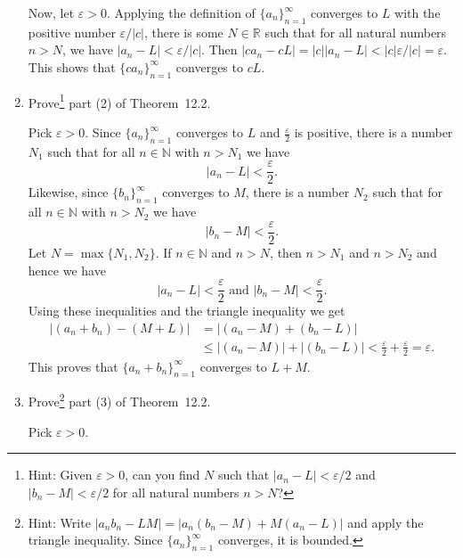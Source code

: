 \documentclass[12pt]{amsart}
\def\e{\varepsilon}
\newcommand{\R}{{\mathbb{R}}}
\newcommand{\N}{\mathbb{N}}
\numberwithin{equation}{section}
\theoremstyle{plain} %
\theoremstyle{definition}
\theoremstyle{remark}
\def\and{{ \text{ and } }}
\begin{document}
\begin{enumerate}
\begin{framed}
Now, let $\e>0$. Applying the definition of $\{a_n\}_{n=1}^\infty$ converges to $L$ with the positive number $\e/|c|$, there is some $N\in \R$ such that for all natural numbers $n>N$, we have $|a_n-L|<\e/|c|$. Then $|ca_n - cL| = |c| |a_n-L| < |c| \e/|c| = \e$. This shows that $\{ca_n\}_{n=1}^\infty$ converges to $cL$.
\end{framed}

\item Prove\footnote{Hint: Given $\varepsilon>0$, can you find $N$ such that $|a_n-L|<\varepsilon/2$ and $|b_n-M|<\varepsilon/2$ for all natural numbers $n>N$?} part (2) of Theorem~12.2.

\begin{framed}
Pick $\e > 0$. 	
	Since $\{a_n\}_{n=1}^\infty$ converges to $L$ and $\frac{\e}{2}$ is positive, 
	there is a number $N_1$ such that for all $n \in \N$ with $n > N_1$ we have
	$$
	|a_n - L| < \frac{\e}{2}.
	$$
	Likewise, 
	since $\{b_n\}_{n=1}^\infty$ converges to $M$,
	there is a number $N_2$ such that for all $n \in \N$ with $n > N_2$ we have
	$$
	|b_n - M| < \frac{\e}{2}.
	$$
	Let $N = \max\{N_1, N_2\}$. If $n \in \N$ and $n > N$, then $n > N_1$ and $n > N_2$ and hence we have
	$$
	|a_n - L| < \frac{\e}{2}
	\and
	|b_n - M| < \frac{\e}{2}.
	$$
	Using these inequalities and the triangle inequality we get
	$$\begin{aligned}
	|(a_n+b_n) - (M+L)| &= |(a_n-M) + (b_n -L)| \\&\leq |(a_n-M)| + |(b_n -L)| < \frac{\e}{2} + \frac{\e}{2}  = \e.\end{aligned}
	$$
	This proves that $\{a_n  + b_n\}_{n=1}^\infty$ converges to $L + M$.
\end{framed}

\item Prove\footnote{Hint: Write $|a_n b_n - L M| = |a_n(b_n -M) + M(a_n - L)|$ and apply the triangle inequality. Since $\{a_n\}_{n=1}^\infty$ converges, it is bounded.}  part (3) of Theorem~12.2.

\begin{framed}
Pick $\e > 0$.
	

\end{framed}
\end{enumerate}
\end{document}
